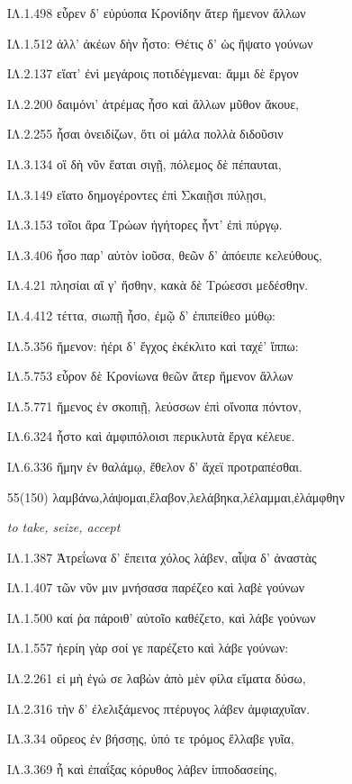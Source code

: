 \begin{enumerate}
{ΙΛ.1.498 εὗρεν δ' εὐρύοπα Κρονίδην ἄτερ ἥμενον ἄλλων 

ΙΛ.1.512 ἀλλ' ἀκέων δὴν ἧστο: Θέτις δ' ὡς ἥψατο γούνων 

ΙΛ.2.137 εἵατ' ἐνὶ μεγάροις ποτιδέγμεναι: ἄμμι δὲ ἔργον 

ΙΛ.2.200 δαιμόνι' ἀτρέμας ἧσο καὶ ἄλλων μῦθον ἄκουε, 

ΙΛ.2.255 ἧσαι ὀνειδίζων, ὅτι οἱ μάλα πολλὰ διδοῦσιν 

ΙΛ.3.134 οἳ δὴ νῦν ἕαται σιγῇ, πόλεμος δὲ πέπαυται, 

ΙΛ.3.149 εἵατο δημογέροντες ἐπὶ Σκαιῇσι πύλῃσι, 

ΙΛ.3.153 τοῖοι ἄρα Τρώων ἡγήτορες ἧντ' ἐπὶ πύργῳ. 

ΙΛ.3.406 ἧσο παρ' αὐτὸν ἰοῦσα, θεῶν δ' ἀπόειπε κελεύθους, 

ΙΛ.4.21 πλησίαι αἵ γ' ἥσθην, κακὰ δὲ Τρώεσσι μεδέσθην. 

ΙΛ.4.412 τέττα, σιωπῇ ἧσο, ἐμῷ δ' ἐπιπείθεο μύθῳ: 

ΙΛ.5.356 ἥμενον: ἠέρι δ' ἔγχος ἐκέκλιτο καὶ ταχέ' ἵππω: 

ΙΛ.5.753 εὗρον δὲ Κρονίωνα θεῶν ἄτερ ἥμενον ἄλλων 

ΙΛ.5.771 ἥμενος ἐν σκοπιῇ, λεύσσων ἐπὶ οἴνοπα πόντον, 

ΙΛ.6.324 ἧστο καὶ ἀμφιπόλοισι περικλυτὰ ἔργα κέλευε. 

ΙΛ.6.336 ἥμην ἐν θαλάμῳ, ἔθελον δ' ἄχεϊ προτραπέσθαι.
}

\clearpage
\item[\large 55(150)]{\large \g λαμβάνω,λάψομαι,ἔλαβον,λελάβηκα,λέλαμμαι,ἐλάμφθην}

\hspace{0.2cm} \textit{ to take, seize, accept }

{\g ΙΛ.1.387 Ἀτρεΐωνα δ' ἔπειτα χόλος λάβεν, αἶψα δ' ἀναστὰς } 

{\g ΙΛ.1.407 τῶν νῦν μιν μνήσασα παρέζεο καὶ λαβὲ γούνων } 

{\g ΙΛ.1.500 καί ῥα πάροιθ' αὐτοῖο καθέζετο, καὶ λάβε γούνων } 

{\g ΙΛ.1.557 ἠερίη γὰρ σοί γε παρέζετο καὶ λάβε γούνων: } 

{\g ΙΛ.2.261 εἰ μὴ ἐγώ σε λαβὼν ἀπὸ μὲν φίλα εἵματα δύσω, } 

{\g ΙΛ.2.316 τὴν δ' ἐλελιξάμενος πτέρυγος λάβεν ἀμφιαχυῖαν. } 

{\g ΙΛ.3.34 οὔρεος ἐν βήσσῃς, ὑπό τε τρόμος ἔλλαβε γυῖα, } 

{\g ΙΛ.3.369 ἦ καὶ ἐπαΐξας κόρυθος λάβεν ἱπποδασείης, } 


\end{enumerate}
